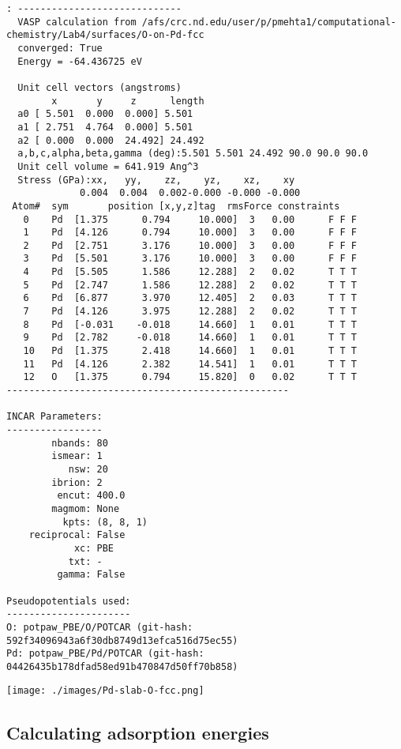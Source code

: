 \documentclass[11pt]{article}
\begin{document}
\begin{verbatim}
: -----------------------------
  VASP calculation from /afs/crc.nd.edu/user/p/pmehta1/computational-chemistry/Lab4/surfaces/O-on-Pd-fcc
  converged: True
  Energy = -64.436725 eV

  Unit cell vectors (angstroms)
        x       y     z      length
  a0 [ 5.501  0.000  0.000] 5.501
  a1 [ 2.751  4.764  0.000] 5.501
  a2 [ 0.000  0.000  24.492] 24.492
  a,b,c,alpha,beta,gamma (deg):5.501 5.501 24.492 90.0 90.0 90.0
  Unit cell volume = 641.919 Ang^3
  Stress (GPa):xx,   yy,    zz,    yz,    xz,    xy
             0.004  0.004  0.002-0.000 -0.000 -0.000
 Atom#  sym       position [x,y,z]tag  rmsForce constraints
   0    Pd  [1.375      0.794     10.000]  3   0.00      F F F
   1    Pd  [4.126      0.794     10.000]  3   0.00      F F F
   2    Pd  [2.751      3.176     10.000]  3   0.00      F F F
   3    Pd  [5.501      3.176     10.000]  3   0.00      F F F
   4    Pd  [5.505      1.586     12.288]  2   0.02      T T T
   5    Pd  [2.747      1.586     12.288]  2   0.02      T T T
   6    Pd  [6.877      3.970     12.405]  2   0.03      T T T
   7    Pd  [4.126      3.975     12.288]  2   0.02      T T T
   8    Pd  [-0.031    -0.018     14.660]  1   0.01      T T T
   9    Pd  [2.782     -0.018     14.660]  1   0.01      T T T
   10   Pd  [1.375      2.418     14.660]  1   0.01      T T T
   11   Pd  [4.126      2.382     14.541]  1   0.01      T T T
   12   O   [1.375      0.794     15.820]  0   0.02      T T T
--------------------------------------------------

INCAR Parameters:
-----------------
        nbands: 80
        ismear: 1
           nsw: 20
        ibrion: 2
         encut: 400.0
        magmom: None
          kpts: (8, 8, 1)
    reciprocal: False
            xc: PBE
           txt: -
         gamma: False

Pseudopotentials used:
----------------------
O: potpaw_PBE/O/POTCAR (git-hash: 592f34096943a6f30db8749d13efca516d75ec55)
Pd: potpaw_PBE/Pd/POTCAR (git-hash: 04426435b178dfad58ed91b470847d50ff70b858)
\end{verbatim}

\begin{center}
\texttt{[image: ./images/Pd-slab-O-fcc.png]}
\end{center}



\subsection{Calculating adsorption energies}
\label{sec:org51c12fe}
\end{document}
